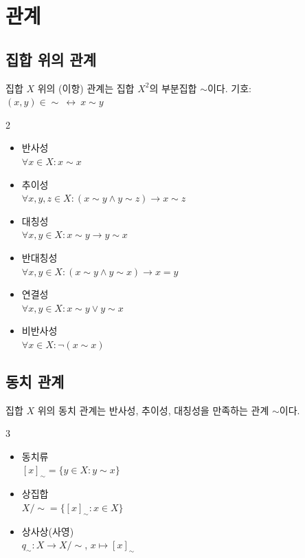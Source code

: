 \documentclass{article}
\begin{document}
\section{관계}
\subsection{집합 위의 관계}
집합 $X$ 위의 (이항) 관계는 집합 $X^2$의 부분집합 $\sim$이다. 기호: $(x,y)\in\sim~\longleftrightarrow~x\sim y$


\begin{multicols}{2}
    \begin{itemize}
        \item 반사성 \\
            $\forall x\in X:x\sim x$
        \item 추이성 \\
            $\forall x,y,z\in X:(x\sim y\wedge y\sim z)\longrightarrow x\sim z$
        \item 대칭성 \\
            $\forall x,y\in X:x\sim y\longrightarrow y\sim x$
        \item 반대칭성 \\
            $\forall x,y\in X:(x\sim y\wedge y\sim x)\longrightarrow x=y$
        \item 연결성 \\
            $\forall x,y\in X:x\sim y\vee y\sim x$
        \item 비반사성 \\
            $\forall x\in X:\neg(x\sim x)$
    \end{itemize}
\end{multicols}

\subsection{동치 관계}

\noindent 집합 $X$ 위의 동치 관계는 반사성, 추이성, 대칭성을 만족하는 관계 $\sim$이다.
\begin{multicols}{3}
    \begin{itemize}
        \item 동치류 \\
            $[x]_\sim=\{y\in X:y\sim x\}$
        \item 상집합 \\
            $X/{\sim}=\{[x]_\sim:x\in X\}$
        \item 상사상(사영) \\
        $q_\sim: X \to X/{\sim}$, $x\mapsto[x]_\sim$
    \end{itemize}
\end{multicols}
\end{document}
